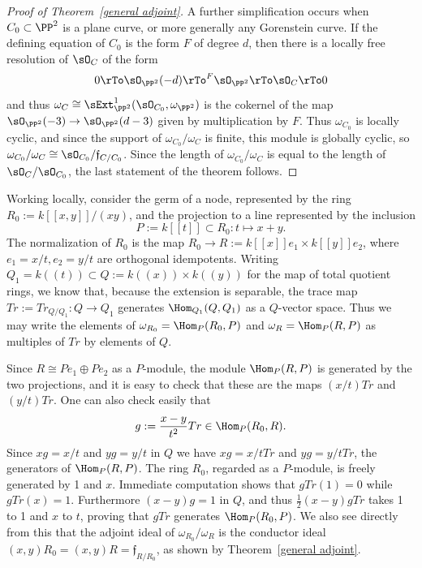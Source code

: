 \begin{proof}[Proof of Theorem~\ref{general adjoint}]
A further simplification occurs when $C_0\subset \PP^2$ is a plane curve, or more generally any 
Gorenstein curve.
If the defining equation of 
$C_0$ is the form $F$ of degree $d$, then there is a locally free resolution of  $\sO_C$ of the form
$$
0\rTo \sO_{\PP^2}(-d) \rTo^F \sO_{\PP^2} \rTo \sO_C \rTo 0
$$
and thus $\omega_C \cong \sExt^1_{\PP^2}(\sO_{C_0}, \omega_{\PP^2})$
is the cokernel of the map $\sO_{\PP^2}(-3) \to \sO_{\PP^2}(d-3)$ given by multiplication by $F$. Thus
$\omega_{C_0}$ is locally cyclic, and  since the support of $\omega_{C_0}/\omega_C$ is finite, this module is
 globally cyclic, so
$\omega_{C_0}/\omega_C \cong \sO_{C_0}/\mathfrak f_{C/C_0}$.
Since the length of $\omega_{C_0}/\omega_C$ is equal to the length of 
$\sO_{C}/\sO_{C_0}$, the last statement of the theorem follows.
\end{proof}

\begin{example}
 Working locally, consider the germ of a node, represented by the ring $R_0:= k[[x,y]]/(xy)$, and
 the projection to a line represented by the inclusion 
 $$
 P:= k[[t]] \subset R_0: t\mapsto x+y.
 $$
 The normalization of $R_0$ is the map $R_0 \to R := k[[x]]e_1\times k[[y]]e_2$,
 where $e_1= x/t, e_2= y/t$ are orthogonal idempotents. Writing 
 $Q_1 = k((t)) \subset Q:= k((x))\times k((y))$
 for the map of total quotient rings, we know that, because the extension is separable, the trace map
 $Tr := Tr_{Q/Q_1}: Q \to Q_1$ generates $\Hom_{Q_1}(Q,Q_1)$ as a $Q$-vector space. Thus we may write the
 elements of $\omega_{R_0} = \Hom_{P}(R_0,P)$ and $\omega_R = \Hom_{P}(R,P)$ as
 multiples of $Tr$ by elements of $Q$.
 
 Since $R \cong Pe_1\oplus Pe_2$ as a $P$-module, the module $\Hom_P(R,P)$ is
 generated by the two projections, and it is easy to check that these are the maps
 $(x/t)Tr$ and $(y/t)Tr$. One can also check easily that 
 $$
 g := \frac{x-y}{t^2} Tr \in \Hom_P(R_0,R).
 $$
 Since
$xg = x/t$ and $yg = y/t$ in $Q$ we have
 $xg = x/tTr$ and $yg= y/tTr$, the generators of $\Hom_{P}(R,P)$. 
 The ring $R_0$, regarded as a $P$-module, is freely generated by 1 and $x$.
 Immediate computation shows that $gTr(1) = 0$ while $gTr(x) = 1$.
 Furthermore $(x-y)g = 1$ in $Q$,  and thus $\frac{1}{2}(x-y)gTr$ takes 1 to 1
 and $x$ to $t$, proving that $gTr$  generates
 $\Hom_P(R_0,P)$. We also see directly from this that the adjoint ideal
 of $\omega_{R_0}/\omega_R$ is the conductor ideal $(x,y)R_0 = (x,y)R = \mathfrak f_{R/R_0}$,
 as shown by  Theorem~\ref{general adjoint}. 
\end{example}

